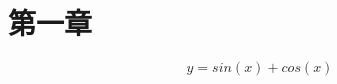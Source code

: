 \documentclass{article}
\author{\kaishu }
\date{\today}
\begin{document}
\section{第一章}


    \[y=sin(x) + cos(x)\]  

     
\end{document}
